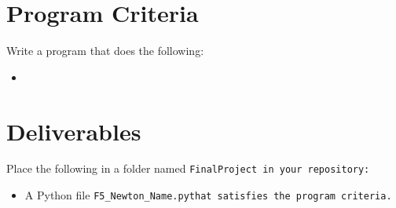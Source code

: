 \documentclass{article}
\newcommand\foldername{\tt{FinalProject} }
\newcommand\filename{\tt{F5\_Newton\_Name.py}\;\;}
\begin{document}
\section*{Program Criteria}
	Write a program that does the following:
	\begin{itemize}
		\item
	\end{itemize}







\section*{Deliverables}
	
	
	Place the following in a folder named \foldername in your repository:
	\begin{itemize}
		\item A Python file \filename  that satisfies the program criteria.
	\end{itemize}

	
\end{document}
